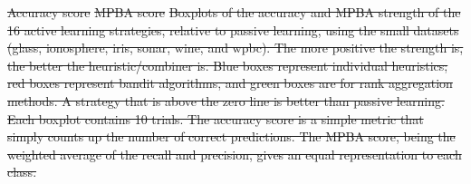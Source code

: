 \documentclass[fleqn,10pt,lineno]{wlpeerj} %
\providecommand{\DIFdeltex}[1]{{\protect\color{red}\sout{#1}}}                      %
\providecommand{\DIFdelbegin}{} %
\providecommand{\DIFdelFL}[1]{\DIFdel{#1}} %
\providecommand{\DIFdel}[1]{\texorpdfstring{\DIFdeltex{#1}}{}} %
\begin{document}
\DIFdelbegin %
{%
\DIFdelFL{Accuracy score}}
{%
\DIFdelFL{MPBA score}}
{%
\DIFdelFL{Boxplots of the accuracy and MPBA strength of the
	16 active learning strategies, relative to passive learning, using the
	small datasets (glass, ionosphere, iris, sonar, wine, and wpbc). The more
	positive the strength is, the better the heuristic/combiner is. Blue boxes
	represent individual heuristics; red boxes represent bandit algorithms, and
	green boxes are for rank aggregation methods. A strategy that is above the
	zero line is better than passive learning. Each boxplot contains 10 trials.
	The accuracy score is a simple metric that simply counts up the number of
	correct predictions. The MPBA score, being the weighted average of the
	recall and precision, gives an equal representation to each class.}}
\end{document}
